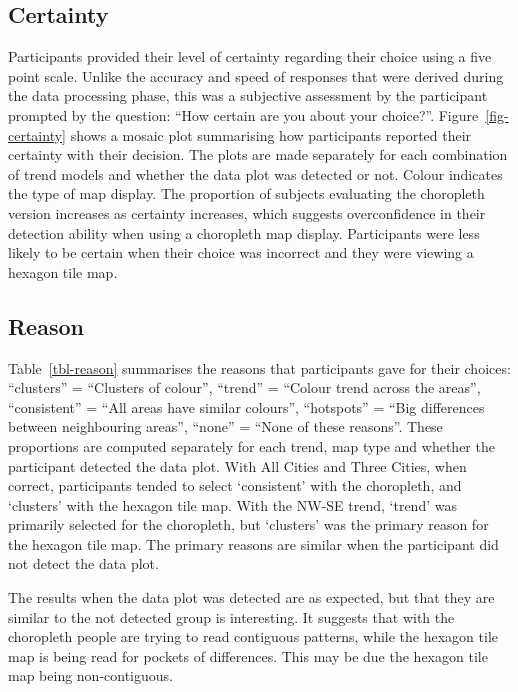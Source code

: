 \documentclass[
doublespace,
  times]{anzsauth}
\begin{document}
\subsection{Certainty}\label{certainty}

Participants provided their level of certainty regarding their choice
using a five point scale. Unlike the accuracy and speed of responses
that were derived during the data processing phase, this was a
subjective assessment by the participant prompted by the question: ``How
certain are you about your choice?''. Figure~\ref{fig-certainty} shows a
mosaic plot summarising how participants reported their certainty with
their decision. The plots are made separately for each combination of
trend models and whether the data plot was detected or not. Colour
indicates the type of map display. The proportion of subjects evaluating
the choropleth version increases as certainty increases, which suggests
overconfidence in their detection ability when using a choropleth map
display. Participants were less likely to be certain when their choice
was incorrect and they were viewing a hexagon tile map.

\subsection{Reason}\label{reason}

Table~\ref{tbl-reason} summarises the reasons that participants gave for
their choices: ``clusters'' = ``Clusters of colour'', ``trend'' =
``Colour trend across the areas'', ``consistent'' = ``All areas have
similar colours'', ``hotspots'' = ``Big differences between neighbouring
areas'', ``none'' = ``None of these reasons''. These proportions are
computed separately for each trend, map type and whether the participant
detected the data plot. With All Cities and Three Cities, when correct,
participants tended to select `consistent' with the choropleth, and
`clusters' with the hexagon tile map. With the NW-SE trend, `trend' was
primarily selected for the choropleth, but `clusters' was the primary
reason for the hexagon tile map. The primary reasons are similar when
the participant did not detect the data plot.

The results when the data plot was detected are as expected, but that
they are similar to the not detected group is interesting. It suggests
that with the choropleth people are trying to read contiguous patterns,
while the hexagon tile map is being read for pockets of differences.
This may be due the hexagon tile map being non-contiguous.
\end{document}
